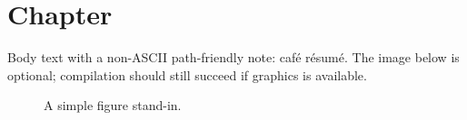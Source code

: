 \section{Chapter}
\label{sec:chapter}
Body text with a non-ASCII path-friendly note: café résumé.
The image below is optional; compilation should still succeed if graphics is available.

\begin{figure}[h]
\centering
{}
\caption{A simple figure stand-in.}
\end{figure}
